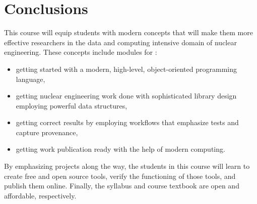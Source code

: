 \documentclass{anstrans}
\begin{document}
\section{Conclusions}

This course will equip students with modern concepts that will make them more
effective researchers in the data and computing intensive domain of nuclear
engineering. These concepts include modules for :

\begin{itemize}
\item getting started with a modern, high-level, object-oriented programming language,
\item getting nuclear engineering work done with sophisticated library design employing powerful data structures,
\item getting correct results by employing workflows that emphasize tests and capture provenance,
\item getting work publication ready with the help of modern computing.
\end{itemize}

By emphasizing projects along the way, the students in this course will learn
to create free and open source tools, verify the functioning of those tools,
and publish them online.  Finally, the syllabus and course textbook are open
and affordable, respectively.


 
\end{document}
